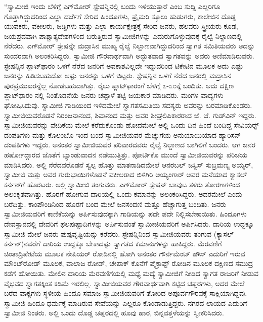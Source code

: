  “ಸ್ವಾಮೀಜಿ ಇಂದು ಬೆಳಿಗ್ಗೆ ಎಗ್‍ಮೋರ್ ಸ್ಟೇಷನ್ನಿನಲ್ಲಿ ಬಂದು ಇಳಿಯುತ್ತಾರೆ ಎಂಬ ಸುದ್ದಿ ಎಲ್ಲರಿಗೂ ಗೊತ್ತಾಗಿದ್ದುದರಿಂದ ಎಲ್ಲಾ ದರ್ಜೆಗೆ ಸೇರಿದ ಹಿಂದೂಗಳು, ಪ್ರೈಮರಿ ಸ್ಕೂಲು ಹುಡುಗರು, ಕಾಲೇಜಿನ ದೊಡ್ಡ ಯುವಕರು, ವಕೀಲರು, ಜಡ್ಡಿಗಳು ಮತ್ತು ಎಲ್ಲಾ ಕಾರ್ಯಕ್ಷೇತ್ರಕ್ಕೆ ಸೇರಿದ ಜನರು, ಹಲವರು ಸ್ತ್ರೀಯರು ಕೂಡ, ಜಯಪ್ರದವಾಗಿ ಪಾಶ್ಚಾತ್ಯದೇಶಗಳಿಂದ ಬರುತ್ತಿರುವ ಸ್ವಾಮೀಜಿಗಳನ್ನು ಎದುರುಗೊಳ್ಳುವುದಕ್ಕೆ ರೈಲ್ವೆ ನಿಲ್ದಾಣದಲ್ಲಿ ನೆರೆದರು. ಎಗ್‍ಮೋರ್ ಸ್ಟೇಷನ್ನೇ ಮದ್ರಾಸಿನ ಮುಖ್ಯ ರೈಲ್ವೆ ನಿಲ್ದಾಣವಾಗಿದ್ದುದರಿಂದ ಸ್ವಾಗತ ಸಮಿತಿಯವರು ಅದನ್ನು ಸುಂದರವಾಗಿ ಅಲಂಕರಿಸಿದ್ದರು. ಸ್ವಾಮೀಜಿ ಗೌರವಾರ್ಥವಾಗಿ ಅದ್ಭುತವಾದ ಸ್ವಾಗತವನ್ನು ಅವರು ಅಣಿಮಾಡಿರುವರು. ಸ್ಟೇಷನ್ನಿನ ಪ್ಲಾಟ್‍ಫಾರಂ ಒಳಗೆ ನೆರೆದ ಜನರಿಗೆ ಅವಕಾಶವಿಲ್ಲದೇ ಇದ್ದುದರಿಂದ ಟಿಕೇಟಿನ ಮೂಲಕ ಅದು ಎಷ್ಟು ಜನರನ್ನು ಹಿಡಿಸಬಹುದೋ ಅಷ್ಟು ಜನರನ್ನು ಒಳಗೆ ಬಿಟ್ಟರು. ಸ್ಟೇಷನ್ನಿನ ಒಳಗೆ ನೆರೆದ ಜನರಲ್ಲಿ ಮದ್ರಾಸಿನ ಪುರಪ್ರಮುಖರನ್ನೆಲ್ಲ ನೋಡಬಹುದಾಗಿತ್ತು. ರೈಲು ಪ್ಲಾಟ್‍ಫಾರಂಗೆ ಬೆಳಿಗ್ಗೆ ೭-೩೦ಕ್ಕೆ ಬಂದಿತು. ಅದು ದಕ್ಷಿಣ ಪ್ಲಾಟ್‍ಫಾರಂ ನಲ್ಲಿ ನಿಂತೊಡನೆಯೆ ಜನರು ಚಪ್ಪಾಳೆ ತಟ್ಟಿ ಜಯಕಾರ ಮಾಡಿದರು. ಮಂಗಳ ವಾದ್ಯಗಳು ಘೋಷಿಸಿದುವು. ಸ್ವಾಮೀಜಿ ಗಾಡಿಯಿಂದ ಇಳಿದಮೇಲೆ ಸ್ವಾಗತಸಮಿತಿಯ ಸದಸ್ಯರು ಅವರನ್ನು ಬರಮಾಡಿಕೊಂಡರು. ಸ್ವಾಮೀಜಿಯವರೊಡನೆ ನಿರಂಜನಾನಂದ, ಶಿವಾನಂದ ಮತ್ತು ಅವರ ಶೀಘ್ರಲಿಪಿಕಾರರಾದ ಜೆ. ಜೆ. ಗುಡ್‍ವಿನ್ ಇದ್ದರು. ಸ್ವಾಮೀಜಿಯವರನ್ನು ವೇದಿಕೆಯ ಮೇಲೆ ಕರೆದುಕೊಂಡು ಹೋದಮೇಲೆ ಅಲ್ಲಿ ಒಂದು ದಿನ ಹಿಂದೆ ಬಂದಿದ್ದ ಸೇವಿಯರ್ಸ್‍‍ ದಂಪತಿಗಳು ಮತ್ತು ಕೊಲಂಬೊ ಇಂದ ಬಂದ ಸ್ವಾಮೀಜಿಯವರ ಮೆಚ್ಚುಗೆಯ ಅನುಯಾಯಿಯಾದ ಹ್ಯಾರಿಸನ್ ದಂಪತಿಗಳು ಇದ್ದರು. ಅನಂತರ ಸ್ವಾಮೀಜಿಯವರ ಪರಿವಾರದವರು ರೈಲ್ವೆ ನಿಲ್ದಾಣದ ಬಾಗಿಲಿಗೆ ಬಂದರು. ಆಗ ಜನರ ಹರ್ಷೋದ್ಗಾರದ ಜೊತೆಗೆ ಬ್ಯಾಂಡುವಾದನ ನಡೆಯುತ್ತಿತ್ತು. ಪೋರ್ಟಿಕೊ ಮುಂದೆ ಸ್ವಾಮೀಜಿಯವರನ್ನು ಪರಿಚಯ ಮಾಡಿಸಿದರು. ಅಲ್ಲಿ ನೆರೆದವರೊಡನೆ ಸ್ವಲ್ಪ ಹೊತ್ತು ಮಾತನಾಡಿದಮೇಲೆ ಆನರಬಲ್ ಜಸ್ಟಿಸ್ ಸುಬ್ರಮಣ್ಯ ಅಯ್ಯರ್, ಸ್ವಾಮೀಜಿ ಮತ್ತು ಅವರ ಗುರುಭಾಯಿಗಳೊಡನೆ ವಕೀಲರಾದ ಬಿಳಿಗಿರಿ ಅಯ್ಯಂಗಾರ್ ಅವರ ಮನೆಯಾದ ಕ್ಯಾಸಲ್ ಕರ್ನನ್‍ಗೆ ಹೊರಟರು. ಅಲ್ಲಿ ಸ್ವಾಮೀಜಿ ತಂಗುವರು. ಎಗ್‍ಮೋರ್ ಸ್ಟೇಷನ್ ಬಾವುಟ ತಳಿರು ತೋರಣಗಳಿಂದ ಅಲಂಕೃತವಾಗಿತ್ತು. ಹೊರಗೆ ಹೋಗುವ ದಾರಿಯಲ್ಲಿ ಒಂದು ಕಮಾನನ್ನು ಅಲಂಕರಿಸಿದ್ದರು. ಅದರಮೇಲೆ  ಎಂದು ಬರೆದಿತ್ತು. ಕಾಂಪೌಂಡಿನಿಂದ ಹೊರಗೆ ಬಂದ ಮೇಲೆ ಜನಸಂದಣಿ ಮತ್ತೂ ಹೆಚ್ಚಾಗುತ್ತ ಬಂದಿತು. ಜನರು ಸ್ವಾಮೀಜಿಯವರಿಗೆ ಕಾಣಿಕೆಯನ್ನು ಅರ್ಪಿಸುವುದಕ್ಕಾಗಿ ಗಾಡಿಯನ್ನು ಪದೇ ಪದೇ ನಿಲ್ಲಿಸಬೇಕಾಯಿತು. ಹಿಂದೂಗಳು ದೇವಸ್ಥಾನದಲ್ಲಿ ದೇವರಿಗೆ ಫಲಪುಷ್ಪಾದಿಗಳನ್ನು ಅರ್ಪಿಸುವಂತೆ ಸ್ವಾಮೀಜಿಯವರಿಗೆ ಅರ್ಪಿಸಿದರು. ದಾರಿಯ ಉದ್ದಕ್ಕೂ ಸ್ವಾಮೀಜಿ ಮೇಲೆ ಜನರು ಪುಷ್ಪವೃಷ್ಟಿಯನ್ನು ಕರೆದರು. ಸ್ಟೇಷನ್ನಿನಿಂದ ಸ್ವಾಮೀಜಿಯವರು ತಂಗುವ  (ಕ್ಯಾಸಲ್ ಕರ್ನನ್)‌ನವರೆಗೆ ದಾರಿಯ ಉದ್ದಕ್ಕೂ ಬೇಕಾದಷ್ಟು ಸ್ವಾಗತದ ಕಮಾನುಗಳನ್ನು ಹಾಕಿದ್ದರು. ಮೆರವಣಿಗೆ ಚಿಂತಾದ್ರಿಪೇಟೆಯ ಮೂಲಕ ನೇಪಿಯರ್ ರೋಡಿನಲ್ಲಿ ಹೋಗಿ ಅನಂತರ ಗೌರ್ನಮೆಂಟ್ ಹೌಸ್ ಎದುರಿಗೆ ಇರುವ ಮೌಂಟ್‍ರೋಡ್ ಮೂಲಕ, ವಾಲಾಜ ರೋಡ್, ಚೇಪಾಕ್ ಕೊನೆಗೆ ಪೈಕ್ರಾಪ್ಟ್ ರೋಡಿನ ಮೂಲಕ ದಕ್ಷಿಣದ ಸಮುದ್ರ ಕಡೆಗೆ ಹೋಯಿತು. ಮೇಲಿನ ದಾರಿಯ ಮೆರವಣಿಗೆಯಲ್ಲಿ ಮಧ್ಯೆ ಮಧ್ಯೆ ಸ್ವಾಮೀಜಿಗೆ ನೀಡಿದ ಸ್ವಾಗತ ರಾಜರಿಗೆ ನೀಡುವ ವೈಭವದ ಸ್ವಾಗತಕ್ಕಿಂತ ಕಡಿಮೆ ಇರಲಿಲ್ಲ. ಸ್ವಾಮೀಜಿಯವರ ಗೌರವಾರ್ಥವಾಗಿ ಕಟ್ಟಿದ ಚಪ್ಪರಗಳು, ಅದರ ಮೇಲೆ ಬರೆದ ವಾಕ್ಯಗಳು ಸ್ಥಳೀಯ ಹಿಂದೂ ಸಮಾಜ ಸ್ವಾಮೀಜಿಯವರಿಗೆ ತೋರಿದ ಅಪೂರ್ವಗೌರವಕ್ಕೆ ಸಾಕ್ಷಿಯಾಗಿದ್ದವು. ಸ್ವಾಮೀಜಿ ಹಿಂದೂ ಧರ್ಮಕ್ಕೆ ಮಾಡಿರುವ ಸೇವೆಯನ್ನು ಎಲ್ಲರೂ ಕೊಂಡಾಡುತ್ತಿದ್ದರು. ನಗರದ ಲಾಯದ ಎದುರಿಗೆ ಸ್ವಾಮೀಜಿ ನಿಂತರು. ಅಲ್ಲಿ ಒಂದು ದೊಡ್ಡ ಚಪ್ಪರದಲ್ಲಿ ಹೂವು ಹಾರ, ಬಿನ್ನವತ್ತಳೆಯನ್ನು ಸ್ವೀಕರಿಸಿದರು. 

